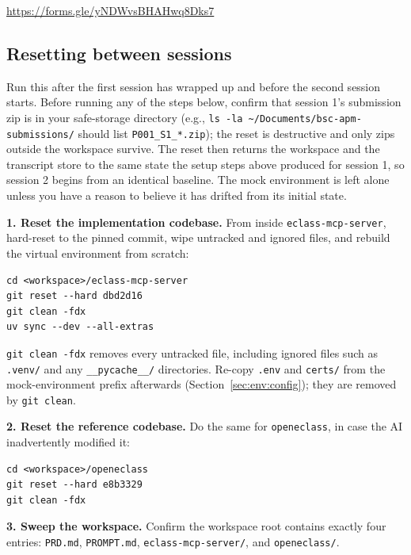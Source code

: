 \documentclass[11pt, a4paper]{article}
\begin{document}
\begin{center}
\href{https://forms.gle/yNDWvsBHAHwq8Dks7}{https://forms.gle/yNDWvsBHAHwq8Dks7}
\end{center}

\subsection{Resetting between sessions}
\label{sec:between}

Run this after the first session has wrapped up and before the second session starts. Before running any of the steps below, confirm that session 1's submission zip is in your safe-storage directory (e.g., \texttt{ls -la \textasciitilde/Documents/bsc-apm-submissions/} should list \texttt{P001\_S1\_*.zip}); the reset is destructive and only zips outside the workspace survive. The reset then returns the workspace and the transcript store to the same state the setup steps above produced for session 1, so session 2 begins from an identical baseline. The mock environment is left alone unless you have a reason to believe it has drifted from its initial state.

\textbf{1. Reset the implementation codebase.} From inside \texttt{eclass-mcp-server}, hard-reset to the pinned commit, wipe untracked and ignored files, and rebuild the virtual environment from scratch:

\begin{verbatim}
cd <workspace>/eclass-mcp-server
git reset --hard dbd2d16
git clean -fdx
uv sync --dev --all-extras
\end{verbatim}

\texttt{git clean -fdx} removes every untracked file, including ignored files such as \texttt{.venv/} and any \texttt{\_\_pycache\_\_/} directories. Re-copy \texttt{.env} and \texttt{certs/} from the mock-environment prefix afterwards (Section~\ref{sec:env:config}); they are removed by \texttt{git clean}.

\textbf{2. Reset the reference codebase.} Do the same for \texttt{openeclass}, in case the AI inadvertently modified it:

\begin{verbatim}
cd <workspace>/openeclass
git reset --hard e8b3329
git clean -fdx
\end{verbatim}

\textbf{3. Sweep the workspace.} Confirm the workspace root contains exactly four entries: \texttt{PRD.md}, \texttt{PROMPT.md}, \texttt{eclass-mcp-server/}, and \texttt{openeclass/}.
\end{document}
